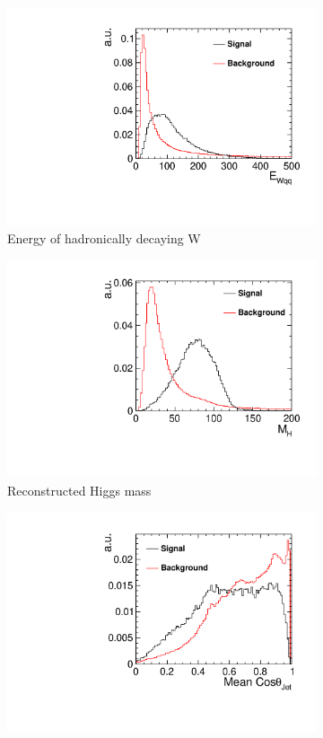 \begin{figure}[ht]\ContinuedFloat 
  \begin{subfigure}[b]{0.5\linewidth}
    \centering
    \includegraphics[width=0.75\linewidth]{Appendix/figures/EWqq} 
    \caption{Energy of hadronically decaying W} 
    \vspace{4ex}
  \end{subfigure}%
  \begin{subfigure}[b]{0.5\linewidth}
    \centering
    \includegraphics[width=0.75\linewidth]{Appendix/figures/HiggsMass} 
    \caption{Reconstructed Higgs mass} 
    \vspace{4ex}
  \end{subfigure} 
  \begin{subfigure}[b]{0.5\linewidth}
    \centering
    \includegraphics[width=0.75\linewidth]{Appendix/figures/JetCosTheta} 

\end{subfigure}
\end{figure}
